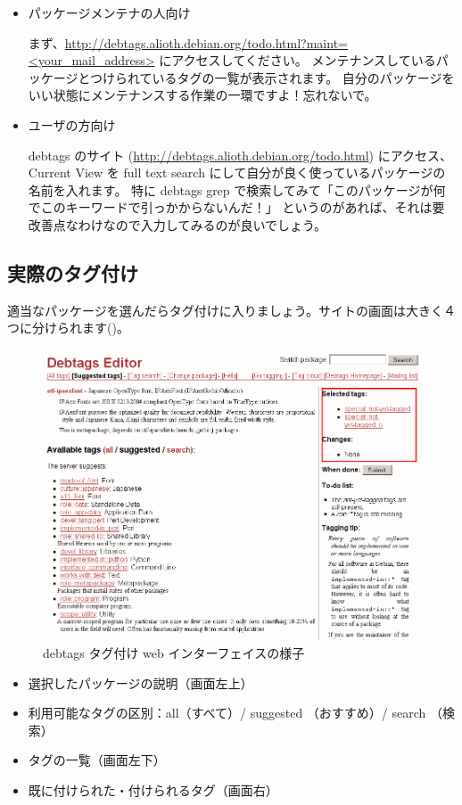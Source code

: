 \documentclass[mingoth,a4paper]{jsarticle}
\begin{document}
\begin{itemize}
  \item パッケージメンテナの人向け

        まず、\url{http://debtags.alioth.debian.org/todo.html?maint=<your_mail_address>} にアクセスしてください。
        メンテナンスしているパッケージとつけられているタグの一覧が表示されます。
        自分のパッケージをいい状態にメンテナンスする作業の一環ですよ！忘れないで。

  \item ユーザの方向け 

         debtags のサイト (\url{http://debtags.alioth.debian.org/todo.html}) にアクセス、
         Current View を full text search にして自分が良く使っているパッケージの名前を入れます。
         特に debtags grep で検索してみて「このパッケージが何でこのキーワードで引っかからないんだ！」
         というのがあれば、それは要改善点なわけなので入力してみるのが良いでしょう。
\end{itemize}

\subsection{実際のタグ付け}

適当なパッケージを選んだらタグ付けに入りましょう。サイトの画面は大きく４つに分けられます()。

\begin{figure}[H]
\begin{center}
 \includegraphics[height=0.5\hsize] {image201004/gotagging02.png}
 \caption{debtags タグ付け web インターフェイスの様子}
\label{fig:gotagging02}
\end{center}
\end{figure}

\begin{itemize}
 \item 選択したパッケージの説明（画面左上）
 \item 利用可能なタグの区別：all（すべて）/ suggested （おすすめ）/ search （検索）
 \item タグの一覧（画面左下）
 \item 既に付けられた・付けられるタグ（画面右）
\end{itemize}
\end{document}
